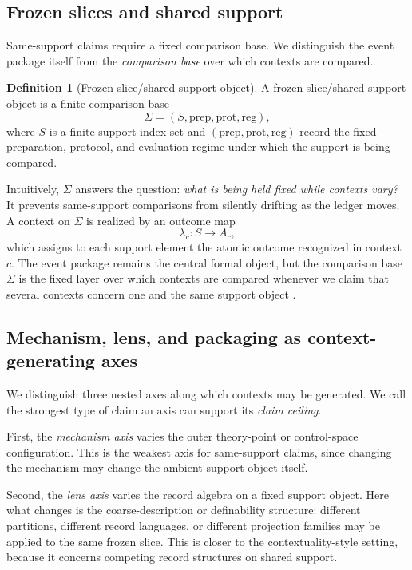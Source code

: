\documentclass[11pt]{article}
\theoremstyle{definition}
\newtheorem{definition}[theorem]{Definition}
\begin{document}
\subsection{Frozen slices and shared support}

Same-support claims require a fixed comparison base. We distinguish the event package itself from the \emph{comparison base} over which contexts are compared.

\begin{definition}[Frozen-slice/shared-support object]
A frozen-slice/shared-support object is a finite comparison base
\[
\Sigma = (S,\mathrm{prep},\mathrm{prot},\mathrm{reg}),
\]
where \(S\) is a finite support index set and \((\mathrm{prep},\mathrm{prot},\mathrm{reg})\) record the fixed preparation, protocol, and evaluation regime under which the support is being compared.
\end{definition}

Intuitively, \(\Sigma\) answers the question: \emph{what is being held fixed while contexts vary?} It prevents same-support comparisons from silently drifting as the ledger moves. A context on \(\Sigma\) is realized by an outcome map
\[
\lambda_c : S \to A_c,
\]
which assigns to each support element the atomic outcome recognized in context \(c\). The event package remains the central formal object, but the comparison base \(\Sigma\) is the fixed layer over which contexts are compared whenever we claim that several contexts concern one and the same support object \citep{Tsiokos2026PackageChange,Tsiokos2026Cantor}.

\subsection{Mechanism, lens, and packaging as context-generating axes}

We distinguish three nested axes along which contexts may be generated. We call the strongest type of claim an axis can support its \emph{claim ceiling}.

First, the \emph{mechanism axis} varies the outer theory-point or control-space configuration. This is the weakest axis for same-support claims, since changing the mechanism may change the ambient support object itself.

Second, the \emph{lens axis} varies the record algebra on a fixed support object. Here what changes is the coarse-description or definability structure: different partitions, different record languages, or different projection families may be applied to the same frozen slice. This is closer to the contextuality-style setting, because it concerns competing record structures on shared support.
\end{document}

